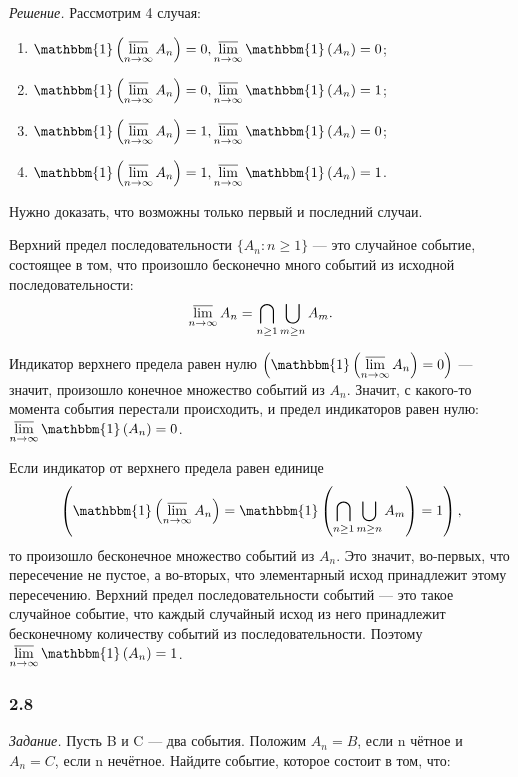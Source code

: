 \documentclass{book}
\begin{document}
\textit{Решение.} Рассмотрим 4 случая: 

\begin{enumerate}
\item $\mathbbm{1}\left(\varlimsup\limits_{n\to\infty}A_n\right)=0, \varlimsup\limits_{n\to\infty}\mathbbm{1}\left(A_n\right)=0$;
\item $\mathbbm{1}\left(\varlimsup\limits_{n\to\infty}A_n\right)=0, \varlimsup\limits_{n\to\infty}\mathbbm{1}\left(A_n\right)=1$;
\item $\mathbbm{1}\left(\varlimsup\limits_{n\to\infty}A_n\right)=1, \varlimsup\limits_{n\to\infty}\mathbbm{1}\left(A_n\right)=0$;
\item $\mathbbm{1}\left(\varlimsup\limits_{n\to\infty}A_n\right)=1, \varlimsup\limits_{n\to\infty}\mathbbm{1}\left(A_n\right)=1$.
\end{enumerate}

Нужно доказать, что возможны только первый и последний случаи.

Верхний предел последовательности $\{A_n: n\geq 1\}$ --- это случайное событие, состоящее в том, что произошло бесконечно много событий из исходной последовательности: $$\varlimsup\limits_{n\to\infty}A_n=\bigcap\limits_{n\geq 1}\bigcup\limits_{m\geq n}A_m.$$


Индикатор верхнего предела равен нулю $\left(\mathbbm{1}\left(\varlimsup\limits_{n\to\infty}A_n\right)=0\right)$ --- значит, произошло конечное множество событий из $A_n$. Значит, с какого-то момента события перестали происходить, и предел индикаторов равен нулю: $\varlimsup\limits_{n\to\infty}\mathbbm{1}\left(A_n\right)=0$.

Если индикатор от верхнего предела равен единице $$\left(\mathbbm{1}\left(\varlimsup\limits_{n\to\infty}A_n\right)=\mathbbm{1}\left(\bigcap\limits_{n\geq 1}\bigcup\limits_{m\geq n}A_m\right)=1\right),$$ то произошло бесконечное множество событий из $A_n$. Это значит, во-первых, что пересечение не пустое, а во-вторых, что элементарный исход принадлежит этому пересечению. Верхний предел последовательности событий --- это такое случайное событие, что каждый случайный исход из него принадлежит бесконечному количеству событий из последовательности. Поэтому $\varlimsup\limits_{n\to\infty}\mathbbm{1}\left(A_n\right)=1$.

\subsubsection*{2.8}

\textit{Задание.} Пусть B и C --- два события. Положим $A_n=B$, если n чётное и $A_n=C$, если n нечётное. Найдите событие, которое состоит в том, что:
\end{document}
